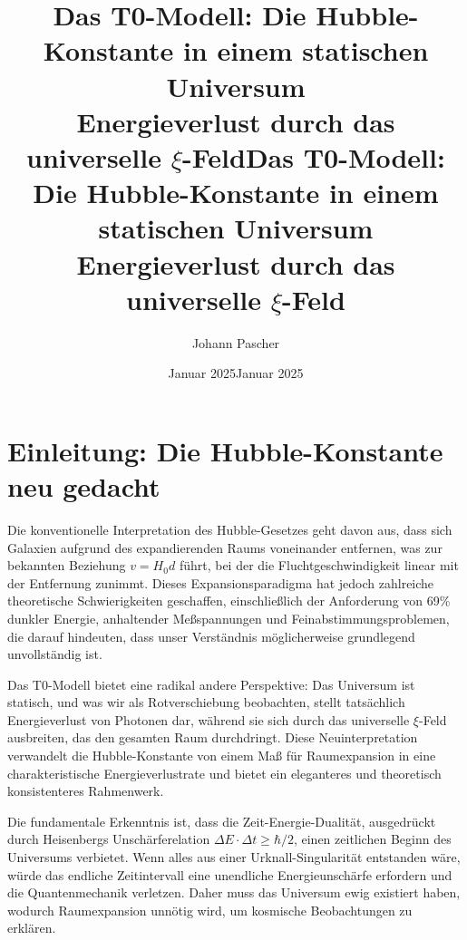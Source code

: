\documentclass[12pt,a4paper]{article}
\title{Das T0-Modell: Die Hubble-Konstante in einem statischen Universum \\
		Energieverlust durch das universelle $\xi$-Feld}
\author{}
\date{Januar 2025}
\begin{document}
	\title{Das T0-Modell: Die Hubble-Konstante in einem statischen Universum \\
		Energieverlust durch das universelle $\xi$-Feld}
	\author{Johann Pascher}
	\date{Januar 2025}
	
	\maketitle
	
	\begin{abstract}
	\end{abstract}
	
	\tableofcontents
	
	\section{Einleitung: Die Hubble-Konstante neu gedacht}
	
	Die konventionelle Interpretation des Hubble-Gesetzes geht davon aus, dass sich Galaxien aufgrund des expandierenden Raums voneinander entfernen, was zur bekannten Beziehung $v = H_0 d$ führt, bei der die Fluchtgeschwindigkeit linear mit der Entfernung zunimmt. Dieses Expansionsparadigma hat jedoch zahlreiche theoretische Schwierigkeiten geschaffen, einschließlich der Anforderung von 69\% dunkler Energie, anhaltender Meßspannungen und Feinabstimmungsproblemen, die darauf hindeuten, dass unser Verständnis möglicherweise grundlegend unvollständig ist.
	
	Das T0-Modell bietet eine radikal andere Perspektive: Das Universum ist statisch, und was wir als Rotverschiebung beobachten, stellt tatsächlich Energieverlust von Photonen dar, während sie sich durch das universelle $\xi$-Feld ausbreiten, das den gesamten Raum durchdringt. Diese Neuinterpretation verwandelt die Hubble-Konstante von einem Maß für Raumexpansion in eine charakteristische Energieverlustrate und bietet ein eleganteres und theoretisch konsistenteres Rahmenwerk.
	
	\begin{revolutionary}
	\end{revolutionary}
	
	Die fundamentale Erkenntnis ist, dass die Zeit-Energie-Dualität, ausgedrückt durch Heisenbergs Unschärferelation $\Delta E \cdot \Delta t \geq \hbar/2$, einen zeitlichen Beginn des Universums verbietet. Wenn alles aus einer Urknall-Singularität entstanden wäre, würde das endliche Zeitintervall eine unendliche Energieunschärfe erfordern und die Quantenmechanik verletzen. Daher muss das Universum ewig existiert haben, wodurch Raumexpansion unnötig wird, um kosmische Beobachtungen zu erklären.
	
\end{document}
